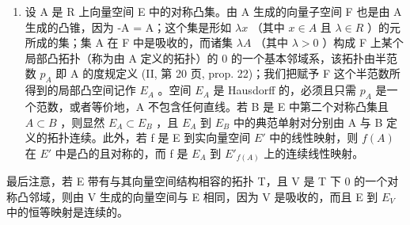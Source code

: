 \begin{enumerate}
\def\labelenumi{\arabic{enumi})}
\setcounter{enumi}{2}
\tightlist
\item
  设 A 是 R 上向量空间 E 中的对称凸集。由 A 生成的向量子空间 F 也是由 A 生成的凸锥，因为 -A = A；这个集是形如 \(\lambda x\) （其中 \(x \in A\) 且 \(\lambda \in R\) ）的元所成的集；集 A 在 F 中是吸收的，而诸集 \(\lambda A\) （其中 \(\lambda > 0\) ）构成 F 上某个局部凸拓扑（称为由 A 定义的拓扑）的 0 的一个基本邻域系，该拓扑由半范数 \(p_{A}\) 即 A 的度规定义 (II, 第 20 页, prop. 22)；我们把赋予 F 这个半范数所得到的局部凸空间记作 \(E_{A}\) 。空间 \(E_{A}\) 是 Hausdorff 的，必须且只需 \(p_{A}\) 是一个范数，或者等价地，A 不包含任何直线。若 B 是 E 中第二个对称凸集且 \(A \subset B\) ，则显然 \(E_{A} \subset E_{B}\) ，且 \(E_{A}\) 到 \(E_{B}\) 中的典范单射对分别由 A 与 B 定义的拓扑连续。此外，若 f 是 E 到实向量空间 \(E'\) 中的线性映射，则 \(f(A)\) 在 \(E'\) 中是凸的且对称的，而 f 是 \(E_{A}\) 到 \(E'_{f(A)}\) 上的连续线性映射。
\end{enumerate}

最后注意，若 E 带有与其向量空间结构相容的拓扑 T，且 V 是 T 下 0 的一个对称凸邻域，则由 V 生成的向量空间与 E 相同，因为 V 是吸收的，而且 E 到 \(E_{V}\) 中的恒等映射是连续的。

